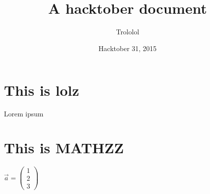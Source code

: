 \documentclass{article}
\title{A hacktober document}
\author{Trololol}
\date{Hacktober 31, 2015}
\begin{document}
	\maketitle	
	\section{This is lolz}
	Lorem ipsum
	\section{This is MATHZZ}
	$
		\vec{a} =
		\begin{pmatrix}
		1 \\
		2 \\
		3
		\end{pmatrix}
	$
\end{document}
